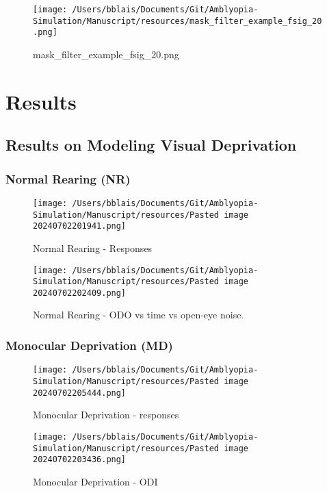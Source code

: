 \documentclass[
]{article}
\begin{document}
\begin{figure}
\centering
\texttt{[image: /Users/bblais/Documents/Git/Amblyopia-Simulation/Manuscript/resources/mask\_filter\_example\_fsig\_20.png]}
\caption{mask\_filter\_example\_fsig\_20.png}\label{figref:mask_filter_example_fsig_20.png}
\end{figure}

\section{Results}\label{sec:results}

\subsection{Results on Modeling Visual
Deprivation}\label{sec:results-on-modeling-visual-deprivation}

\subsubsection{Normal Rearing (NR)}\label{sec:normal-rearing-nr}

\begin{figure}
\centering
\texttt{[image: /Users/bblais/Documents/Git/Amblyopia-Simulation/Manuscript/resources/Pasted image 20240702201941.png]}
\caption{Normal Rearing -
Responses}\label{fig:Pasted_image_20240702201941.png}
\end{figure}

\begin{figure}
\centering
\texttt{[image: /Users/bblais/Documents/Git/Amblyopia-Simulation/Manuscript/resources/Pasted image 20240702202409.png]}
\caption{Normal Rearing - ODO vs time vs open-eye
noise.}\label{fig:Pasted_image_20240702202409.png}
\end{figure}

\subsubsection{Monocular Deprivation
(MD)}\label{sec:monocular-deprivation-md}

\begin{figure}
\centering
\texttt{[image: /Users/bblais/Documents/Git/Amblyopia-Simulation/Manuscript/resources/Pasted image 20240702205444.png]}
\caption{Monocular Deprivation -
responses}\label{fig:Pasted_image_20240702205444.png}
\end{figure}

\begin{figure}
\centering
\texttt{[image: /Users/bblais/Documents/Git/Amblyopia-Simulation/Manuscript/resources/Pasted image 20240702203436.png]}
\caption{Monocular Deprivation -
ODI}\label{fig:Pasted_image_20240702203436.png}
\end{figure}
\end{document}

